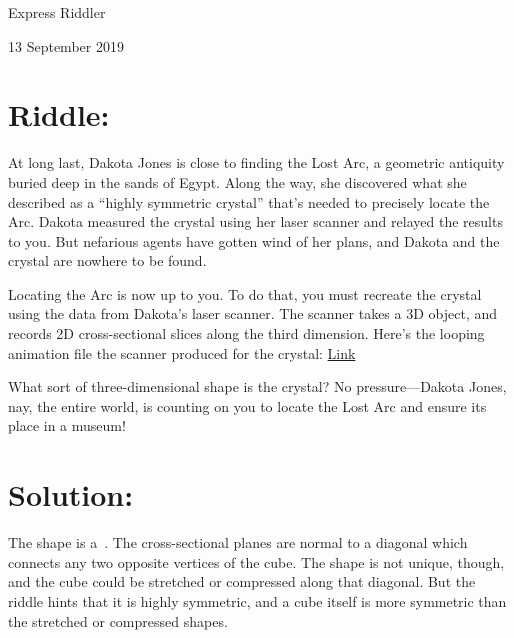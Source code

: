 \documentclass{article}
\begin{document}
\pagestyle{empty} %

\begin{center}
{\LARGE Express Riddler}

\vspace{0.15in}

{\Large 13 September 2019}
\end{center}


\section*{Riddle:}

At long last, Dakota Jones is close to finding the Lost Arc, a geometric antiquity buried deep in the sands of Egypt.
Along the way, she discovered what she described as a ``highly symmetric crystal'' that's needed to precisely locate the Arc.
Dakota measured the crystal using her laser scanner and relayed the results to you.
But nefarious agents have gotten wind of her plans, and Dakota and the crystal are nowhere to be found.

Locating the Arc is now up to you.
To do that, you must recreate the crystal using the data from Dakota's laser scanner.
The scanner takes a 3D object, and records 2D cross-sectional slices along the third dimension.
Here's the looping animation file the scanner produced for the crystal: \href{https://fivethirtyeight.com/wp-content/uploads/2019/09/jones_538.gif}{Link}

What sort of three-dimensional shape is the crystal?
No pressure---Dakota Jones, nay, the entire world, is counting on you to locate the Lost Arc and ensure its place in a museum!


\section*{Solution:}

The shape is a
\,.
The cross-sectional planes are normal to a diagonal which connects any two opposite vertices of the cube.
The shape is not unique, though, and the cube could be stretched or compressed along that diagonal.
But the riddle hints that it is highly symmetric, and a cube itself is more symmetric than the stretched or compressed shapes.
\end{document}

